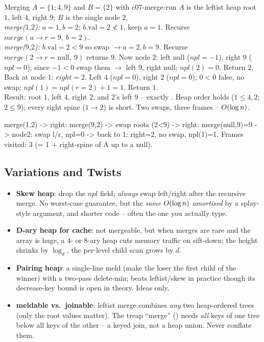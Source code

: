 \begin{example}{Merging $A=\{1;4,9\}$ and $B=\{2\}$ with }{c07-merge-run}
$A$ is the leftist heap root $1$, left $4$, right $9$; $B$ is the single node $2$.\\
\emph{merge($1$,$2$):} $a{=}1,b{=}2$; $b\text{.val}=2 \not< 1$, keep $a{=}1$. Recurse
$\mathit{merge}(a{\to}r{=}9,\ b{=}2)$.\\
\quad\emph{merge($9$,$2$):} $b\text{.val}=2<9$ so swap $\to a{=}2,b{=}9$. Recurse
$\mathit{merge}(2{\to}r{=}\text{null},\ 9)$ returns $9$. Now node $2$: left null ($\mathit{npl}{=}-1$),
right $9$ ($\mathit{npl}{=}0$); since $-1<0$ swap them $\to$ left $9$, right null; $\mathit{npl}(2)=0$.
Return $2$.\\
Back at node $1$: $\mathit{right}=2$. Left $4$ ($\mathit{npl}{=}0$), right $2$ ($\mathit{npl}{=}0$);
$0<0$ false, no swap; $\mathit{npl}(1)=\mathit{npl}(r{=}2)+1=1$. Return $1$.\\
Result: root $1$, left $4$, right $2$, and $2$'s left $9$ -- exactly . Heap order
holds ($1\le4,2$; $2\le9$); every right spine ($1\to2$) is short. Two swaps, three frames -- $O(\log n)$.
\end{example}
\begin{tracebox}
merge(1,2) -> right: merge(9,2) -> swap roots (2<9) -> right: merge(null,9)=9 -> node2: swap l/r, npl=0
-> back to 1: right=2, no swap, npl(1)=1. Frames visited: 3 (= 1 + right-spine of A up to a null).
\end{tracebox}

\subsection{Variations and Twists}

\begin{itemize}[nosep]
  \item \textbf{Skew heap}: drop the $\mathit{npl}$ field; \emph{always} swap left/right after the recursive
        merge. No worst-case guarantee, but the \emph{same} $O(\log n)$ \emph{amortised} by a splay-style
        argument, and shorter code -- often the one you actually type. \hfill{}
  \item \textbf{D-ary heap for cache}: not mergeable, but when merges are rare and the array is huge, a
        $4$- or $8$-ary heap cuts memory traffic on sift-down; the height shrinks by $\log_d$, the per-level
        child scan grows by $d$. \hfill{}
  \item \textbf{Pairing heap}: a single-line meld (make the loser the first child of the winner) with a
        two-pass delete-min; beats leftist/skew in practice though its decrease-key bound is open in theory.
        Ideas only. \hfill{}
  \item \textbf{ meldable vs.\ joinable}: leftist merge combines \emph{any} two heap-ordered trees (only the
        root values matter). The treap ``merge'' () needs \emph{all} keys of one tree
        below all keys of the other -- a keyed join, not a heap union. Never conflate them. \hfill{}
\end{itemize}

